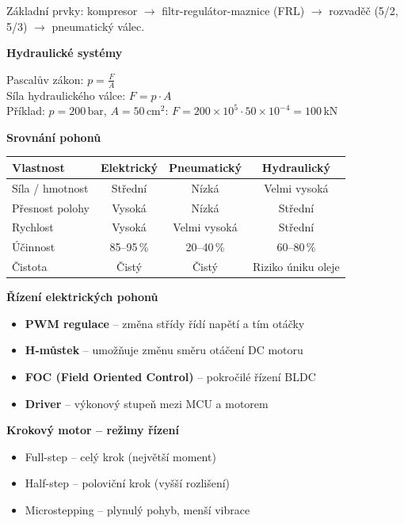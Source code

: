 \documentclass[a4paper,10pt]{article}
\begin{document}
\begin{vysvetlenibox}
Základní prvky: kompresor $\to$ filtr-regulátor-maznice (FRL)
$\to$ rozvaděč (5/2, 5/3) $\to$ pneumatický válec.

\textbf{Hydraulické systémy}

\begin{vzorcebox}
Pascalův zákon: $p = \frac{F}{A}$ \quad [Pa = N/m²]\\
Síla hydraulického válce: $F = p \cdot A$\\
Příklad: $p = 200\,\text{bar}$, $A = 50\,\text{cm}^2$:
$F = 200 \times 10^5 \cdot 50 \times 10^{-4} = 100\,\text{kN}$
\end{vzorcebox}

\textbf{Srovnání pohonů}

\begin{center}
\begin{tabular}{@{} l c c c @{}}
    \toprule
    \textbf{Vlastnost} & \textbf{Elektrický}
                       & \textbf{Pneumatický} & \textbf{Hydraulický} \\
    \midrule
    Síla / hmotnost & Střední & Nízká & Velmi vysoká \\
    Přesnost polohy & Vysoká & Nízká & Střední \\
    Rychlost        & Vysoká & Velmi vysoká & Střední \\
    Účinnost        & 85--95\,\% & 20--40\,\% & 60--80\,\% \\
    Čistota         & Čistý & Čistý & Riziko úniku oleje \\
    \bottomrule
\end{tabular}

\textbf{Řízení elektrických pohonů}
\begin{itemize}[noitemsep, leftmargin=1.4em, topsep=4pt]
    \item \textbf{PWM regulace} -- změna střídy řídí napětí a tím otáčky
    \item \textbf{H-můstek} -- umožňuje změnu směru otáčení DC motoru
    \item \textbf{FOC (Field Oriented Control)} -- pokročilé řízení BLDC
    \item \textbf{Driver} -- výkonový stupeň mezi MCU a motorem
\end{itemize}

\textbf{Krokový motor -- režimy řízení}
\begin{itemize}[noitemsep, leftmargin=1.4em, topsep=4pt]
    \item Full-step -- celý krok (největší moment)
    \item Half-step -- poloviční krok (vyšší rozlišení)
    \item Microstepping -- plynulý pohyb, menší vibrace
\end{itemize}


\end{center}
\end{vysvetlenibox}
\end{document}
